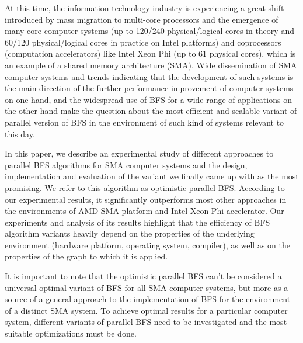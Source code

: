 \documentclass[letterpaper]{article}
\begin{document}
		At this time, the information technology industry is experiencing a great shift introduced by mass migration to multi-core processors and the emergence of many-core computer systems (up to 120/240 physical/logical cores in theory and 60/120 physical/logical cores in practice on Intel platforms) and coprocessors (computation accelerators) like Intel Xeon Phi (up to 61 physical cores), which is an example of a shared memory architecture (SMA).
		Wide dissemination of SMA computer systems and trends indicating that the development of such systems is the main direction of the further performance improvement of computer systems on one hand, and the widespread use of BFS for a wide range of applications on the other hand make the question about the most efficient and scalable variant of parallel version of BFS in the environment of such kind of systems relevant to this day.
				
		In this paper, we describe an experimental study of different approaches to parallel BFS algorithms for SMA computer systems and the design, implementation and evaluation of the variant we finally came up with as the most promising.
		We refer to this algorithm as optimistic parallel BFS.
		According to our experimental results, it significantly outperforms most other approaches in the environments of AMD SMA platform and Intel Xeon Phi accelerator.
		Our experiments and analysis of its results highlight that the efficiency of BFS algorithm variants heavily depend on the properties of the underlying environment (hardware platform, operating system, compiler), as well as on the properties of the graph to which it is applied. 
		
		It is important to note that the optimistic parallel BFS can't be considered a universal optimal variant of BFS for all SMA computer systems, but more as a source of a general approach to the implementation of BFS for the environment of a distinct SMA system.
		To achieve optimal results for a particular computer system, different variants of parallel BFS need to be investigated and the most suitable optimizations must be done.
	
	
\end{document}
